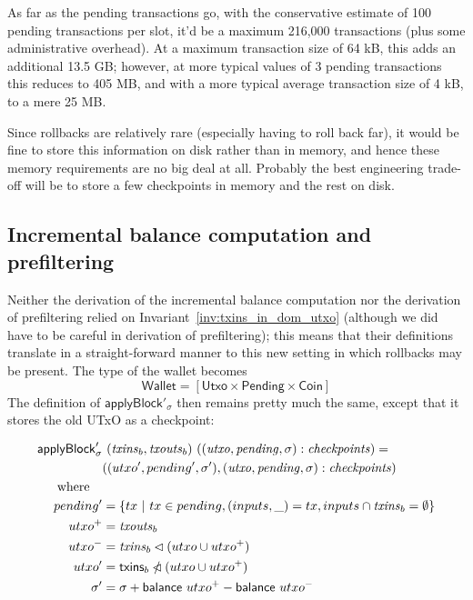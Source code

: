 \documentclass{article}
\newcommand{\restrictdom}{\lhd}
\newcommand{\subtractdom}{\mathbin{\slashed{\restrictdom}}}
\begin{document}
As far as the pending transactions go, with the conservative estimate of 100
pending transactions per slot, it'd be a maximum 216,000 transactions (plus some
administrative overhead). At a maximum transaction size of 64 kB, this adds an
additional 13.5 GB; however, at more typical values of 3 pending transactions
this reduces to 405 MB, and with a more typical average transaction size of 4
kB, to a mere 25 MB.

Since rollbacks are relatively rare (especially having to roll back far), it
would be fine to store this information on disk rather than in memory, and hence
these memory requirements are no big deal at all. Probably the best engineering
trade-off will be to store a few checkpoints in memory and the rest on disk.


\subsection{Incremental balance computation and prefiltering}

Neither the derivation of the incremental balance computation nor the derivation
of prefiltering relied on Invariant~\ref{inv:txins_in_dom_utxo} (although we did
have to be careful in derivation of prefiltering); this means that their
definitions translate in a straight-forward manner to this new setting in which
rollbacks may be present. The type of the wallet becomes
%
\begin{equation*}
\mathsf{Wallet} = [\mathsf{Utxo} \times \mathsf{Pending} \times \mathsf{Coin}]
\end{equation*}
%
The definition of $\mathsf{applyBlock}'_\sigma$ then remains pretty much the
same, except that it stores the old UTxO as a checkpoint:

\begin{equation*}
\begin{split}
\mathsf{applyBlock}'_\sigma & ~ (\mathit{txins}_b, \mathit{txouts}_b) ~ ((\mathit{utxo}, \mathit{pending}, \sigma) : \mathit{checkpoints}) = \\
& ((utxo^\prime, pending^\prime, \sigma^\prime), (\mathit{utxo}, \mathit{pending}, \sigma) : \mathit{checkpoints}) \\
\text{where} \quad \\
    pending^\prime & = \{ tx ~|~ tx \in pending, (inputs, \_) = tx, inputs \cap \mathit{txins}_b = \emptyset \} \\
    utxo^+ & = \mathit{txouts}_b \\
    utxo^- & = \mathit{txins}_b \restrictdom (utxo \cup utxo^+) \\
    utxo^\prime & = \mathsf{txins}_b \subtractdom (utxo \cup utxo^+) \\
    \sigma^\prime & = \sigma + \mathsf{balance} ~ utxo^+ - \mathsf{balance} ~ utxo^- \\
\end{split}
\end{equation*}
\end{document}
